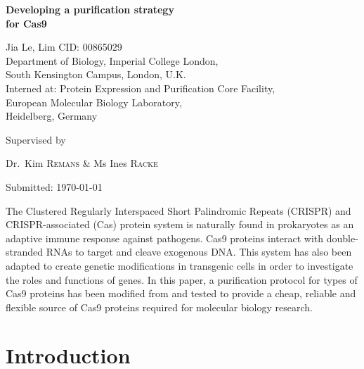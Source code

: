 \documentclass[11pt]{article}
\renewenvironment{abstract}
 {\hspace{.8cm}
  {\bfseries\Large\abstractname}
  \list{}{
    \setlength{\leftmargin}{.95cm}%
    \setlength{\rightmargin}{\leftmargin}%
  }%
  \item\relax}
 {\endlist}
\begin{document}
\begin{titlepage}
	\centering
	\vspace*{\fill}
	{\huge\bfseries Developing a purification strategy \\ for Cas9\par}
	\vspace{2cm}
	{\Large Jia Le, Lim {    }  CID: 00865029}
	\\ 	\vspace{0.5cm}
	{Department of Biology, Imperial College London, \\South Kensington Campus, London, U.K.} \\ \vspace{0.5cm}
	{Interned at: Protein Expression and Purification Core Facility, \\European Molecular Biology Laboratory,\\ Heidelberg, Germany} \\
	\vspace*{\fill}
	{\large Supervised by\par
	Dr.~Kim \textsc{Remans} \& Ms Ines \textsc{Racke} }
	\vfill
	{\large Submitted: \today\par}
\end{titlepage}

\vspace*{\fill}
\tableofcontents 
\vspace*{\fill} 
\thispagestyle{empty}

\doublespacing

\newpage
{}
\vspace*{\fill}
\begin{abstract}  
\doublespacing
The Clustered Regularly Interspaced Short Palindromic Repeats (CRISPR) and CRISPR-associated (Cas) protein system is naturally found in prokaryotes as an adaptive immune response against pathogens. Cas9 proteins interact with double-stranded RNAs to target and cleave exogenous DNA. This system has also been adapted to create genetic modifications in transgenic cells in order to investigate the roles and functions of genes. In this paper, a purification protocol for types of Cas9 proteins has been modified from \cite{Jinek2012a} and tested to provide a cheap, reliable and flexible source of Cas9 proteins required for molecular biology research. 

\end{abstract}
\vfill


\newpage
{}
\section{Introduction} 
\end{document}
